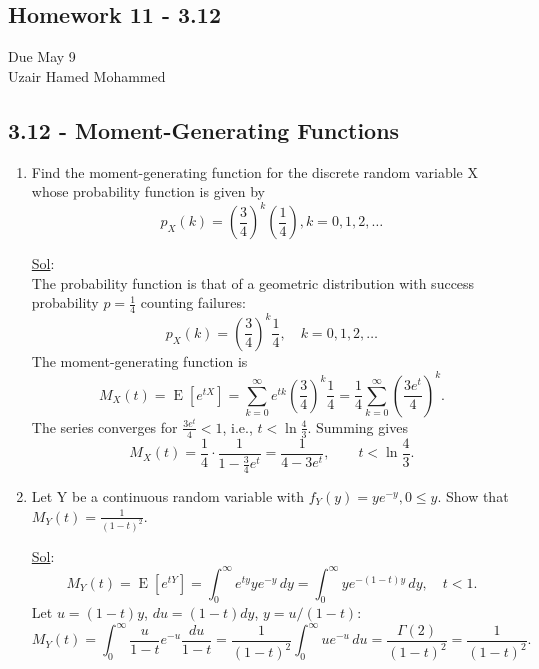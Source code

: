 \begin{center}
	\section*{Homework 11 - 3.12}
	Due May 9 \\
	Uzair Hamed Mohammed
\end{center}


\subsection*{3.12 - Moment-Generating Functions}
\begin{enumerate}
	\item[4.] Find the moment-generating function for the discrete random variable X whose probability function is given by
	      \[
		      p_X (k) = (\frac{3}{4})^k (\frac{1}{4}), k = 0, 1, 2, \dots
	      \]

	      \underline{Sol}: \\

	      The probability function is that of a geometric distribution with success probability \(p = \frac{1}{4}\) counting failures:
	      \[
		      p_X(k) = \left(\frac{3}{4}\right)^k \frac{1}{4}, \quad k = 0, 1, 2, \dots
	      \]
	      The moment-generating function is
	      \[
		      M_X(t) = \operatorname{E}[e^{tX}] = \sum_{k=0}^\infty e^{tk} \left(\frac{3}{4}\right)^k \frac{1}{4}
		      = \frac{1}{4} \sum_{k=0}^\infty \left(\frac{3e^t}{4}\right)^k.
	      \]
	      The series converges for \(\frac{3e^t}{4} < 1\), i.e., \(t < \ln\frac{4}{3}\). Summing gives
	      \[
		      M_X(t) = \frac{1}{4} \cdot \frac{1}{1 - \frac{3}{4}e^t} = \frac{1}{4 - 3e^t},
		      \qquad t < \ln\frac{4}{3}.
	      \]

	\item[8.] Let Y be a continuous random variable with \(f_Y (y) = ye^{-y}, 0 \leq y\). Show that \(M_Y (t) = \frac{1}{(1 - t)^2}\).

	      \underline{Sol}: \\

	      \[
		      M_Y(t) = \operatorname{E}[e^{tY}] = \int_0^\infty e^{ty} y e^{-y} \, dy = \int_0^\infty y e^{-(1-t)y} \, dy, \quad t<1.
	      \]
	      Let \(u = (1-t)y\), \(du = (1-t)dy\), \(y = u/(1-t)\):
	      \[
		      M_Y(t) = \int_0^\infty \frac{u}{1-t} e^{-u} \frac{du}{1-t} = \frac{1}{(1-t)^2} \int_0^\infty u e^{-u} \, du = \frac{\Gamma(2)}{(1-t)^2} = \frac{1}{(1-t)^2}.
	      \]


\end{enumerate}
